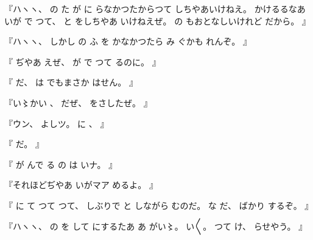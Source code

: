 『ハヽヽ、
%
の
た
が
に
らなかつたからつて
しちやあいけねえ。
%
かけるるなあ
いが
で
つて、
%
と
をしちやあ
いけねえぜ。
%
の
もおとなしいけれど
だから。
』

『ハヽヽ、
%
しかし
の
ふ
を
かなかつたら
み
ぐかも
れんぞ。
』

『
ぢやあ
えぜ、
%
が
で
つて
るのに。
』

『
だ、
%
は
でもまさか
はせん。
』

『い〻かい
、
%
だぜ、
%
をさしたぜ。
』

『ウン、
%
よしツ。
%
に
、
』

『
だ。
』

『
が
んで
る
の
は
いナ。
』

『それほどぢやあ
いがマア
めるよ。
』

『
に
て
つて
つて、
%
しぶりで
と
しながら
むのだ。
%
な
だ、
%
ばかり
するぞ。
』

『ハヽヽ、
%
の
を
して
にするたあ
あ
がい〻。
%
い〳〵。
%
つて
け、
%
らせやう。%
』
